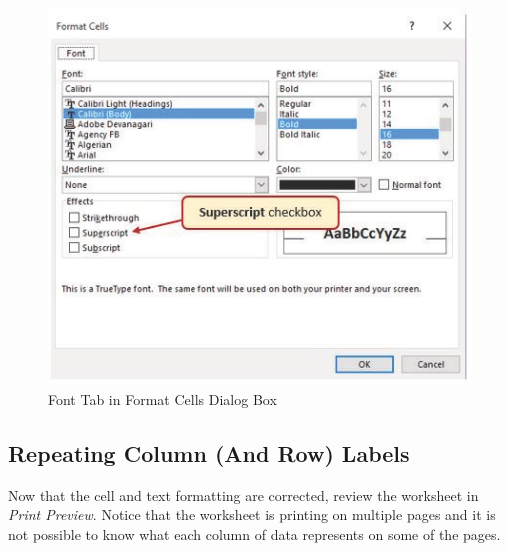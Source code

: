 \begin{figure}[H]
	\centering
	\includegraphics[width=\maxwidth{.95\linewidth}]{gfx/ch03_fig28}
	\caption{Font Tab in Format Cells Dialog Box}
	\label{03:fig28}
\end{figure}

\subsection{Repeating Column (And Row) Labels}

Now that the cell and text formatting are corrected, review the worksheet in \textit{Print Preview}. Notice that the worksheet is printing on multiple pages and it is not possible to know what each column of data represents on some of the pages.

